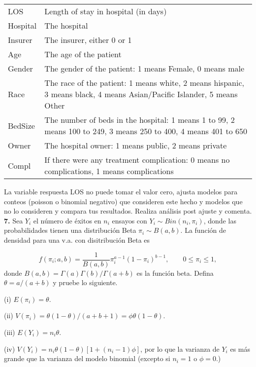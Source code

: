 \documentclass[12pt,a4paper,oneside]{article}
\begin{document}
 \begin{table}[htpb]
 	\centering
 	\begin{tabular}{lp{10cm}}
 		LOS&	Length of stay in hospital (in days)\\
 		Hospital&	The hospital\\
 		Insurer &	The insurer, either 0 or 1\\
 		Age&	The age of the patient\\
 		Gender &	The gender of the patient: 1 means Female, 0 means male\\
 		Race	&The race of the patient: 1 means white, 2 means hispanic, 3 means black, 4 means Asian/Pacific Islander, 5 means Other \\
 		BedSize&	The number of beds in the hospital: 1 means 1 to 99, 2 means 100 to 249, 3 means 250 to 400, 4 means 401 to 650 \\
 		Owner	&The hospital owner: 1 means public, 2 means private\\
 		Compl&	If there were any treatment complication: 0 means no complications, 1 means complications
 	\end{tabular}	
 \end{table}
 
\noindent La variable respuesta LOS no puede tomar el valor cero, ajusta modelos para conteos (poisson o binomial negativo) que consideren este hecho y modelos que no lo consideren y compara tus resultados.  Realiza análisis post ajuste y comenta.\\
 
 
 \noindent \textbf{7. }  Sea $Y_{i}$ el número de éxitos en $n_i$ ensayos con $Y_i \sim Bin(n_i,\pi_i)$, donde las probabilidades tienen una distribución Beta $\pi_i \sim B(a,b)$. La función de densidad para una v.a. con disitribución Beta es
 
 $$f(\pi_i;a,b) = \dfrac{1}{B(a,b)} \pi_i^{a-1}(1-\pi_i)^{b-1}, \qquad 0\leq \pi_i \leq 1,$$ donde $B(a,b) =\Gamma(a)\Gamma(b)/ \Gamma(a+b)$ es la función beta. Defina $\theta = a/(a+b)$ y pruebe lo siguiente.\\
 
 \begin{compactenum}
 	\item[(i)] $E(\pi_i) = \theta$.
 	\item[(ii)] $V(\pi_i) = {\theta(1-\theta)}/(a+b+1)= \phi \theta (1-\theta)$.
 	\item[(iii)] $E(Y_i) = n_i\theta$.
 	\item[(iv)]  $V(Y_i) = n_i\theta(1-\theta)\left[1+(n_i-1)\phi\right]$, por lo que la varianza de $Y_i$ es más grande que la varianza del modelo binomial (excepto si $n_i=1$ o $\phi=0$.)\\
 \end{compactenum}
 
\end{document}

